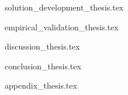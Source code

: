 \documentclass[11pt,a4paper]{report}
\begin{document}
{solution_development_thesis.tex}

{empirical_validation_thesis.tex}

{discussion_thesis.tex}

{conclusion_thesis.tex}




\renewcommand{\bibname}{References}


\renewcommand{\bibname}{Webliography}
\renewcommand{\bibname}{Systematic Literature Review References}

\appendix
{appendix_thesis.tex}

\PrintIndex
\end{document}
